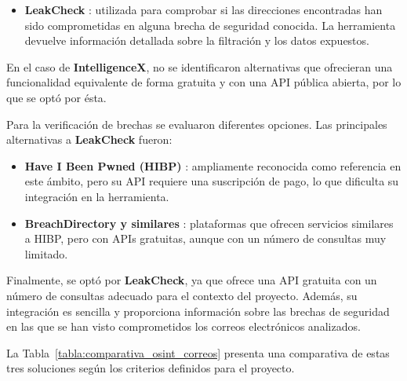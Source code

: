 \begin{parskipenv}
\begin{itemize}
  \item \textbf{LeakCheck} \cite{leakcheck}: utilizada para comprobar si las direcciones encontradas han sido comprometidas en alguna brecha de seguridad conocida. La herramienta devuelve información detallada sobre la filtración y los datos expuestos.
\end{itemize}

En el caso de \textbf{IntelligenceX}, no se identificaron alternativas que ofrecieran una funcionalidad equivalente de forma gratuita y con una API pública abierta, por lo que se optó por ésta.

Para la verificación de brechas se evaluaron diferentes opciones. Las principales alternativas a \textbf{LeakCheck} fueron:

\begin{itemize}
  \item \textbf{Have I Been Pwned (HIBP)} \cite{hibp}: ampliamente reconocida como referencia en este ámbito, pero su API requiere una suscripción de pago, lo que dificulta su integración en la herramienta.

  \item \textbf{BreachDirectory y similares} \cite{breachdirectory}: plataformas que ofrecen servicios similares a HIBP, pero con APIs gratuitas, aunque con un número de consultas muy limitado.
\end{itemize}

Finalmente, se optó por \textbf{LeakCheck}, ya que ofrece una API gratuita con un número de consultas adecuado para el contexto del proyecto. Además, su integración es sencilla y proporciona información sobre las brechas de seguridad en las que se han visto comprometidos los correos electrónicos analizados.

La Tabla~\ref{tabla:comparativa_osint_correos} presenta una comparativa de estas tres soluciones según los criterios definidos para el proyecto.

\begin{table}[H]
\centering
\renewcommand{\arraystretch}{1.4}
\caption{Comparativa de herramientas para verificación de correos filtrados.}
\label{tabla:comparativa_osint_correos}
\end{table}


\end{parskipenv}
